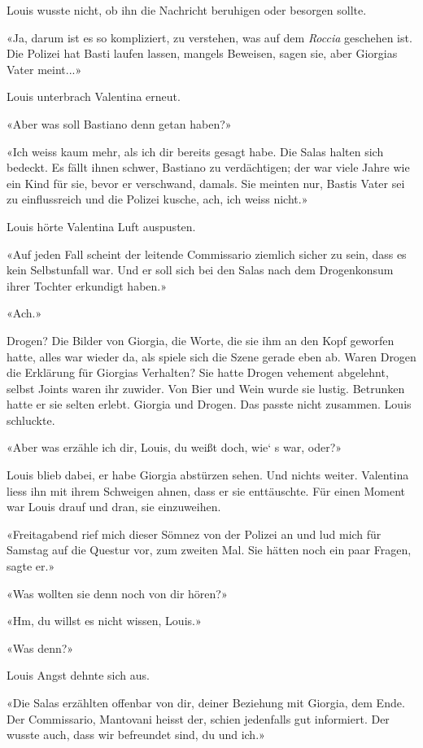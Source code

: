 Louis wusste nicht, ob ihn die Nachricht beruhigen oder besorgen sollte.

«Ja, darum ist es so kompliziert, zu verstehen, was auf dem
\emph{Roccia} geschehen ist. Die Polizei hat Basti laufen lassen,
mangels Beweisen, sagen sie, aber Giorgias Vater meint...»

Louis unterbrach Valentina erneut.

«Aber was soll Bastiano denn getan haben?»

«Ich weiss kaum mehr, als ich dir bereits gesagt habe. Die Salas halten
sich bedeckt. Es fällt ihnen schwer, Bastiano zu verdächtigen; der war
viele Jahre wie ein Kind für sie, bevor er verschwand, damals. Sie
meinten nur, Bastis Vater sei zu einflussreich und die Polizei kusche,
ach, ich weiss nicht.»

Louis hörte Valentina Luft auspusten.

«Auf jeden Fall scheint der leitende Commissario ziemlich sicher zu
sein, dass es kein Selbstunfall war. Und er soll sich bei den Salas nach
dem Drogenkonsum ihrer Tochter erkundigt haben.»

«Ach.»

Drogen? Die Bilder von Giorgia, die Worte, die sie ihm an den Kopf
geworfen hatte, alles war wieder da, als spiele sich die Szene gerade
eben ab. Waren Drogen die Erklärung für Giorgias Verhalten? Sie hatte
Drogen vehement abgelehnt, selbst Joints waren ihr zuwider. Von Bier und
Wein wurde sie lustig. Betrunken hatte er sie selten erlebt. Giorgia und
Drogen. Das passte nicht zusammen. Louis schluckte.

«Aber was erzähle ich dir, Louis, du weißt doch, wie` s war, oder?»

Louis blieb dabei, er habe Giorgia abstürzen sehen. Und nichts weiter.
Valentina liess ihn mit ihrem Schweigen ahnen, dass er sie enttäuschte.
Für einen Moment war Louis drauf und dran, sie einzuweihen.

«Freitagabend rief mich dieser Sömnez von der Polizei an und lud mich
für Samstag auf die Questur vor, zum zweiten Mal. Sie hätten noch ein
paar Fragen, sagte er.»

«Was wollten sie denn noch von dir hören?»

«Hm, du willst es nicht wissen, Louis.»

«Was denn?»

Louis Angst dehnte sich aus.

«Die Salas erzählten offenbar von dir, deiner Beziehung mit Giorgia, dem
Ende. Der Commissario, Mantovani heisst der, schien jedenfalls gut
informiert. Der wusste auch, dass wir befreundet sind, du und ich.»

